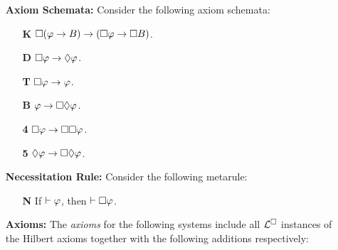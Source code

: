 \documentclass[a4paper, 11pt]{article} %
\begin{document}
\begin{enumerate}[leftmargin=1.2in,itemsep=2pt] %
	\item[\bf Axiom Schemata:] Consider the following axiom schemata:\vspace{-.05in}
    \vspace{-.05in}
    \begin{multicols}{2}
      \begin{enumerate}
        \item[\bf K] $\Box(\varphi\rightarrow B)\rightarrow(\Box \varphi\rightarrow\Box B)$.
        \item[\bf D] $\Box \varphi\rightarrow\Diamond \varphi$.
        \item[\bf T] $\Box \varphi\rightarrow \varphi$.
        \item[\bf B] $\varphi\rightarrow\Box\Diamond \varphi$.
        \item[\bf 4] $\Box \varphi\rightarrow\Box\Box \varphi$.
        \item[\bf 5] $\Diamond \varphi\rightarrow\Box\Diamond \varphi$.
      \end{enumerate}
    \end{multicols}
    \vspace{-.1in}
	\item[\bf Necessitation Rule:] Consider the following metarule:
    \begin{enumerate}
      \item[\bf N] If $ \vdash \varphi$, then $ \vdash\Box \varphi$.
    \end{enumerate}
	\item[\bf Axioms:] The \textit{axioms} for the following systems include all $\mathcal{L}^{\square}$ instances of the Hilbert axioms together with the following additions respectively:
    \vspace{-.05in}
\end{enumerate}
\end{document}
